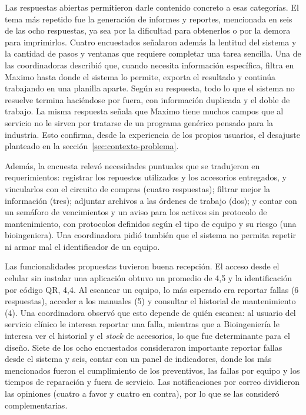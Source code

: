 \documentclass[10pt]{article}
\begin{document}
Las respuestas abiertas permitieron darle contenido concreto a esas categorías. El tema más repetido fue la generación de informes y reportes, mencionada en seis de las ocho respuestas, ya sea por la dificultad para obtenerlos o por la demora para imprimirlos. Cuatro encuestados señalaron además la lentitud del sistema y la cantidad de pasos y ventanas que requiere completar una tarea sencilla. Una de las coordinadoras describió que, cuando necesita información específica, filtra en Maximo hasta donde el sistema lo permite, exporta el resultado y continúa trabajando en una planilla aparte. Según su respuesta, todo lo que el sistema no resuelve termina haciéndose por fuera, con información duplicada y el doble de trabajo. La misma respuesta señala que Maximo tiene muchos campos que al servicio no le sirven por tratarse de un programa genérico pensado para la industria. Esto confirma, desde la experiencia de los propios usuarios, el desajuste planteado en la sección~\ref{sec:contexto-problema}.

Además, la encuesta relevó necesidades puntuales que se tradujeron en requerimientos: registrar los repuestos utilizados y los accesorios entregados, y vincularlos con el circuito de compras (cuatro respuestas); filtrar mejor la información (tres); adjuntar archivos a las órdenes de trabajo (dos); y contar con un semáforo de vencimientos y un aviso para los activos sin protocolo de mantenimiento, con protocolos definidos según el tipo de equipo y su riesgo (una bioingeniera). Una coordinadora pidió también que el sistema no permita repetir ni armar mal el identificador de un equipo.

Las funcionalidades propuestas tuvieron buena recepción. El acceso desde el celular sin instalar una aplicación obtuvo un promedio de 4,5 y la identificación por código QR, 4,4. Al escanear un equipo, lo más esperado era reportar fallas (6 respuestas), acceder a los manuales (5) y consultar el historial de mantenimiento (4). Una coordinadora observó que esto depende de quién escanea: al usuario del servicio clínico le interesa reportar una falla, mientras que a Bioingeniería le interesa ver el historial y el \textit{stock} de accesorios, lo que fue determinante para el diseño. Siete de los ocho encuestados consideraron importante reportar fallas desde el sistema y seis, contar con un panel de indicadores, donde los más mencionados fueron el cumplimiento de los preventivos, las fallas por equipo y los tiempos de reparación y fuera de servicio. Las notificaciones por correo dividieron las opiniones (cuatro a favor y cuatro en contra), por lo que se las consideró complementarias.
\end{document}
